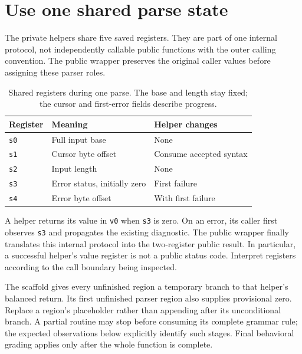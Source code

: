 \section{Use one shared parse state}\label{expression-helper-state}
The private helpers share five saved registers. They are part of one internal protocol,
not independently callable public functions with the outer calling convention. The public
wrapper preserves the original caller values before assigning these parser roles.

\begin{table}[htbp]
  \centering
  \caption{Shared registers during one parse. The base and length stay fixed; the cursor and first-error fields describe progress.}
  \begin{tabular}{lll}
    \toprule
    Register    & Meaning                      & Helper changes          \\
    \midrule
    \texttt{s0} & Full input base              & None                    \\
    \texttt{s1} & Cursor byte offset           & Consume accepted syntax \\
    \texttt{s2} & Input length                 & None                    \\
    \texttt{s3} & Error status, initially zero & First failure           \\
    \texttt{s4} & Error byte offset            & With first failure      \\
    \bottomrule
  \end{tabular}
\end{table}

A helper returns its value in \texttt{v0} when \texttt{s3} is zero. On an error,
its caller first observes \texttt{s3} and propagates the existing diagnostic. The
public wrapper finally translates this internal protocol into the two-register
public result. In particular, a successful helper's value register is not a public
status code. Interpret registers according to the call boundary being inspected.

The scaffold gives every unfinished region a temporary branch to that helper's
balanced return. Its first unfinished parser region also supplies provisional zero.
Replace a region's placeholder rather than appending after its unconditional branch.
A partial routine may stop before consuming its complete grammar rule; the expected
observations below explicitly identify such stages. Final behavioral grading applies
only after the whole function is complete.
